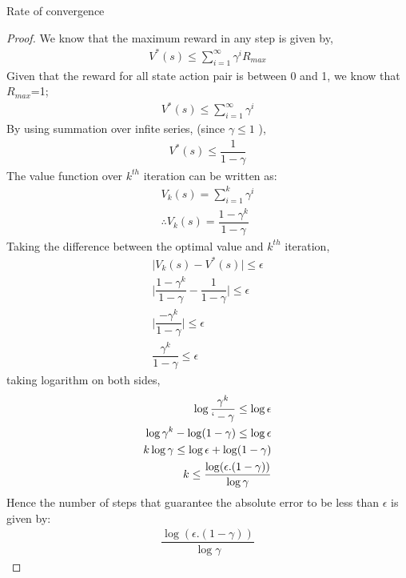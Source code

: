\documentclass[12pt]{article}
\newenvironment{problem}[2][\large Problem]{\begin{trivlist}
\item[\hskip \labelsep {\bfseries #1}\hskip \labelsep {\bfseries #2.}]}{\end{trivlist}}
\begin{document}
\begin{problem} {7} Rate of convergence\\

\begin{proof}	
We know that the maximum reward in any step is given by,
\begin{align}
	V^*(s) \leq \sum_{i=1}^{\infty} \gamma^i R_{max}
	\nonumber
\end{align}
Given that the reward for all state action pair is between 0 and 1, we know that $R_{max}$=1;
\begin{align}
V^*(s) \leq \sum_{i=1}^{\infty} \gamma^i 
\nonumber
\end{align}
By using summation over infite series, (since $\gamma \leq 1$ ),
\begin{align}
V^*(s) \leq \dfrac{1}{1-\gamma} 
\nonumber
\end{align}
The value function over $k^{th}$ iteration can be written as:
\begin{align}
V_k(s) = \sum_{i=1}^{k} \gamma^i \nonumber\\
\therefore V_k(s) = \dfrac{1-\gamma^k}{1-\gamma}
\nonumber
\end{align}
Taking the difference between the optimal value and $k^{th}$ iteration,
\begin{align}
\vert V_k(s) - V^*(s) \vert \leq \epsilon
\nonumber \\
\vert \dfrac{1-\gamma^k}{1-\gamma} -  \dfrac{1}{1-\gamma} \vert \leq \epsilon 
\nonumber\\
\vert \dfrac{-\gamma^k}{1-\gamma} \vert \leq \epsilon
\nonumber\\
 \dfrac{\gamma^k}{1-\gamma}  \leq \epsilon 
\nonumber
\end{align}
taking logarithm on both sides, 
\begin{align}
	\log \dfrac{\gamma^k}{`-\gamma} \leq \log \epsilon \nonumber \\
	\log \gamma^k - \log (1-\gamma) \leq \log \epsilon \nonumber \\
	k \log \gamma \leq \log \epsilon + \log (1-\gamma) \nonumber \\
	k \leq \dfrac{\log(\epsilon . (1-\gamma))}{\log \gamma }\nonumber
\end{align}
Hence the number of steps that guarantee the absolute error to be less than $\epsilon$ is given by: 
\begin{align}
\dfrac{\log(\epsilon . (1-\gamma))}{\log \gamma }\nonumber
\end{align} 
\end{proof}	

\end{problem}
\end{document}
